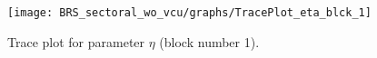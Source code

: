 \begin{figure}[H]
\centering
  \texttt{[image: BRS\_sectoral\_wo\_vcu/graphs/TracePlot\_eta\_blck\_1]}\\
    \caption{Trace plot for parameter ${\eta}$ (block number 1).}
\end{figure}
